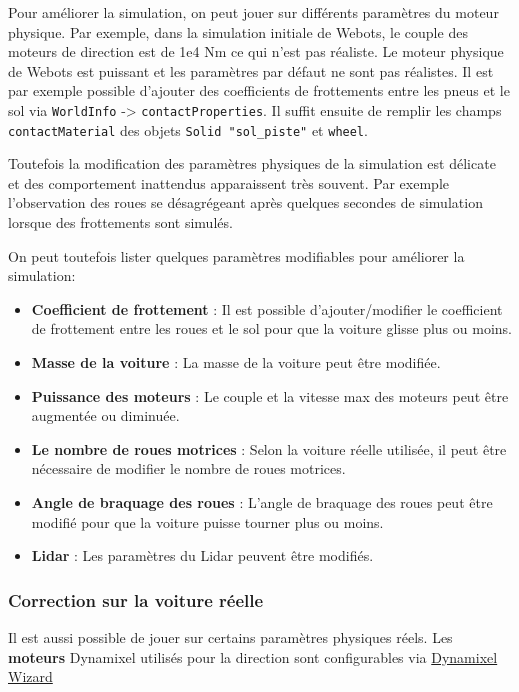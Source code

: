 \documentclass[french]{article}
\begin{document}
Pour améliorer la simulation, on peut jouer sur différents paramètres du moteur physique. Par exemple, dans la simulation initiale de Webots, le couple des moteurs de direction est de 1e4 Nm ce qui n'est pas réaliste.
Le moteur physique de Webots est puissant et les paramètres par défaut ne sont pas réalistes.
Il est par exemple possible d'ajouter des coefficients de frottements entre les pneus et le sol via \verb|WorldInfo| -> \verb|contactProperties|. Il suffit ensuite de remplir les champs \verb|contactMaterial| des objets \verb|Solid "sol_piste"| et \verb|wheel|.
\vspace*{0.5cm}

Toutefois la modification des paramètres physiques de la simulation est délicate et des comportement inattendus apparaissent très souvent. Par exemple l'observation des roues se désagrégeant après quelques secondes de simulation lorsque des frottements sont simulés.
\vspace*{0.5cm}

On peut toutefois lister quelques paramètres modifiables pour améliorer la simulation:
\begin{itemize}
    \item \textbf{Coefficient de frottement} : Il est possible d'ajouter/modifier le coefficient de frottement entre les roues et le sol pour que la voiture glisse plus ou moins.
    \item \textbf{Masse de la voiture} : La masse de la voiture peut être modifiée.
    \item \textbf{Puissance des moteurs} : Le couple et la vitesse max des moteurs peut être augmentée ou diminuée.
    \item \textbf{Le nombre de roues motrices} : Selon la voiture réelle utilisée, il peut être nécessaire de modifier le nombre de roues motrices.
    \item \textbf{Angle de braquage des roues} : L'angle de braquage des roues peut être modifié pour que la voiture puisse tourner plus ou moins.
    \item \textbf{Lidar} : Les paramètres du Lidar peuvent être modifiés.
\end{itemize} 

\subsubsection{Correction sur la voiture réelle} \vspace{0.5cm}

Il est aussi possible de jouer sur certains paramètres physiques réels. Les \textbf{moteurs} Dynamixel utilisés pour la direction sont configurables via \href{https://emanual.robotis.com/docs/en/software/dynamixel/dynamixel_wizard2/}{Dynamixel Wizard}
\vspace{0.5cm}
\end{document}
